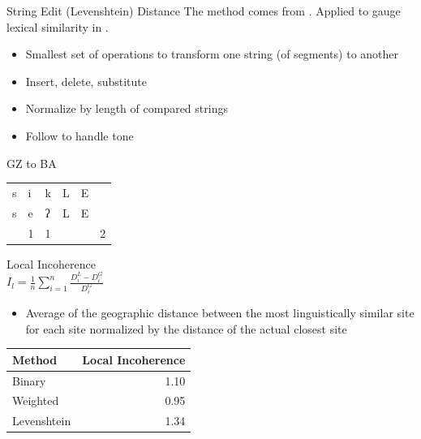 \documentclass[presentation]{beamer}
\begin{document}
\begin{frame}[label={sec:orgea8c843}]{String Edit (Levenshtein) Distance}
The method comes from \textcite{levenshtein1966binarycodes}. Applied to gauge lexical similarity in \textcite{nerbonne2003lexicaldistance}.
\begin{itemize}
\item Smallest set of operations to transform one string (of segments) to another
\item Insert, delete, substitute
\item Normalize by length of compared strings
\item Follow \textcite{yangcastro2008representingtone} to handle tone
\end{itemize}

GZ to BA
\begin{center}
\begin{tabular}{llllll}
s & i & k & L & E & \\
s & e & ʔ & L & E & \\
\hline
 & 1 & 1 &  &  & 2\\
\end{tabular}
\end{center}
\end{frame}

\begin{frame}[label={sec:org1cb0736}]{Local Incoherence}
\textcite{nerbonnekleiweg2007dialectologicalyardstick} \\
\(I_l = \frac{1}{n}\displaystyle \sum_{i=1}^{n} \frac{D_i^L - D_i^G}{D_i^G}\)
\begin{itemize}
\item Average of the geographic distance between the most linguistically similar site for each site normalized by the distance of the actual closest site
\end{itemize}

\begin{center}
\begin{tabular}{lr}
Method & Local Incoherence\\
\hline
Binary & 1.10\\
Weighted & 0.95\\
Levenshtein & 1.34\\
\end{tabular}
\end{center}
\end{frame}
\end{document}
